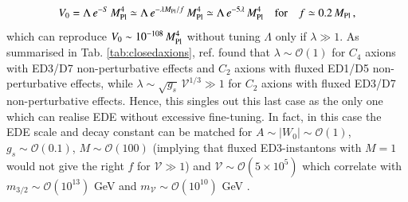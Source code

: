 \begin{equation}
V_0 = \Lambda\,e^{-S}\,M_{\rm Pl}^4 \simeq \Lambda\,e^{- \lambda M_{\rm Pl}/f}\,M_{\rm Pl}^4 \simeq \Lambda\,e^{- 5 \lambda}\,M_{\rm Pl}^4\quad \text{for}\quad f \simeq 0.2\,M_{\rm Pl}\,,
\label{KeyRel}
\end{equation}
which can reproduce $V_0 \sim 10^{-108}\,M_{\rm Pl}^4$ without tuning $\Lambda$ only if $\lambda \gg 1$. As summarised in Tab. \ref{tab:closedaxions}, ref. \cite{Cicoli:2021gss} found that $\lambda\sim\mathcal{O}(1)$ for $C_4$ axions with ED3/D7 non-perturbative effects and $C_2$ axions with fluxed ED1/D5 non-perturbative effects, while $\lambda\sim \sqrt{g_s}\,\mathcal{V}^{1/3}\gg 1$ for $C_2$ axions with fluxed ED3/D7 non-perturbative effects. Hence, this singles out this last case as the only one which can realise EDE without excessive fine-tuning. In fact, in this case the EDE scale and decay constant can be matched for $A\sim |W_0|\sim\mathcal{O}(1)$, $g_s\sim\mathcal{O}(0.1)$, $M\sim \mathcal{O}(100)$ (implying that fluxed ED3-instantons with $M=1$ would not give the right $f$ for $\mathcal{V}\gg 1$) and $\mathcal{V}\sim \mathcal{O}(5\times 10^5)$ which correlate with $m_{3/2}\sim\mathcal{O}(10^{13})$ GeV and $m_{\mathcal{V}}\sim \mathcal{O}(10^{10})$ GeV \cite{Cicoli:2023qri}.


\newpage